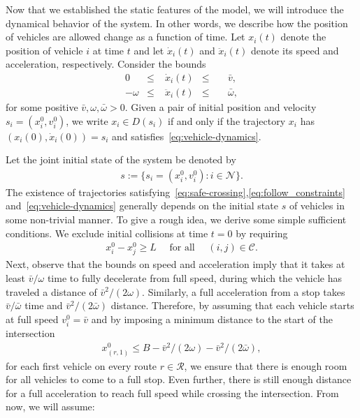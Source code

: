 \documentclass[a4paper]{report}
\theoremstyle{definition}
\theoremstyle{plain}
\begin{document}
Now that we established the static features of the model, we will introduce the
dynamical behavior of the system. In other words, we describe how the position
of vehicles are allowed change as a function of time.
%
Let $x_{i}(t)$ denote the position of vehicle $i$ at time $t$ and let
$\dot{x}_{i}(t)$ and $\ddot{x}_{i}(t)$ denote its speed and acceleration,
respectively.
%
Consider the bounds
\begin{subequations}\label{eq:vehicle-dynamics}
\begin{alignat}{3}
  0         & \leq & \; \dot{x}_{i}(t)  & \leq && \; \bar{v}  , \label{eq:speed-constr} \\
  {-\omega} & \leq & \; \ddot{x}_{i}(t) & \leq && \; \bar{\omega} ,
\end{alignat}
\end{subequations}
for some positive $\bar{v}, \omega, \bar{\omega} > 0$.
%
Given a pair of initial position and velocity $s_{i} = (x_{i}^{0}, v_{i}^{0})$,
we write $x_{i} \in D(s_{i})$ if and only if the trajectory $x_{i}$ has
$(x_{i}(0), \dot{x}_{i}(0)) = s_{i}$ and satisfies~\eqref{eq:vehicle-dynamics}.

Let the joint initial state of the system be denoted by
\begin{align*}
  s := \{s_{i} = (x_{i}^{0}, v_{i}^{0}) : i \in \mathcal{N} \} .
\end{align*}
%
The existence of trajectories
satisfying~\eqref{eq:safe-crossing},\eqref{eq:follow_constraints}
and~\eqref{eq:vehicle-dynamics} generally depends on the initial state $s$ of
vehicles in some non-trivial manner.
%
To give a rough idea, we derive some simple sufficient conditions.
We exclude initial collisions at time $t=0$ by requiring
\begin{align}\label{eq:initially-safe-assumption}
 x_{i}^{0} - x_{j}^{0} \geq L \quad \text{ for all } \quad  (i,j) \in \mathcal{C} .
\end{align}
%
%
Next, observe that the bounds on speed and acceleration imply that it takes at
least $\bar{v}/\omega$ time to fully decelerate from full speed, during which the
vehicle has traveled a distance of $\bar{v}^2/(2\omega)$. Similarly, a full
acceleration from a stop takes $\bar{v}/\bar{\omega}$ time and
$\bar{v}^2/(2\bar{\omega})$ distance.
%
Therefore, by assuming that each vehicle starts at full speed
$v_{i}^{0} = \bar{v}$ and by imposing a minimum distance to the start of the
intersection
\begin{align}\label{eq:initial-safe-stopping-assumption}
  x_{(r,1)}^{0} \leq B - \bar{v}^2/(2\omega) - \bar{v}^2/(2\bar{\omega}),
\end{align}
for each first vehicle on every route
$r \in \mathcal{R}$, we ensure that there is enough room for all vehicles to
come to a full stop. Even further, there is still enough distance for a full
acceleration to reach full speed while crossing the intersection.
%
From now, we will assume:
\end{document}
